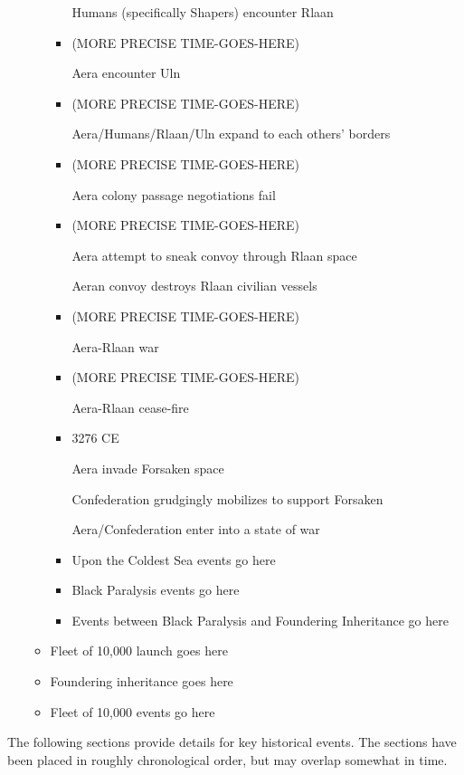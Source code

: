 \begin{itemize}
\begin{itemize}
\begin{itemize}
Humans (specifically Shapers) encounter Rlaan 
\item	(MORE PRECISE TIME-GOES-HERE) 

Aera encounter Uln 
\item	(MORE PRECISE TIME-GOES-HERE) 

Aera/Humans/Rlaan/Uln expand to each others' borders 
\item	(MORE PRECISE TIME-GOES-HERE) 

Aera colony passage negotiations fail 
\item	(MORE PRECISE TIME-GOES-HERE) 

Aera attempt to sneak convoy through Rlaan space 

Aeran convoy destroys Rlaan civilian vessels 
\item	(MORE PRECISE TIME-GOES-HERE) 

Aera-Rlaan war 
\item	(MORE PRECISE TIME-GOES-HERE) 

Aera-Rlaan cease-fire 
\item	3276 CE 

Aera invade Forsaken space 

Confederation grudgingly mobilizes to support Forsaken 

Aera/Confederation enter into a state of war 

\item Upon the Coldest Sea events go here
\label{timeline:UtCS}
\item Black Paralysis events go here
\item Events between Black Paralysis and Foundering Inheritance go here
\end{itemize}
\item Fleet of 10,000 launch goes here
\item Foundering inheritance goes here
\item Fleet of 10,000 events go here
\end{itemize}
\end{itemize}


The following sections provide details for key historical events. The
sections have been placed in roughly chronological order, but may
overlap somewhat in time.

